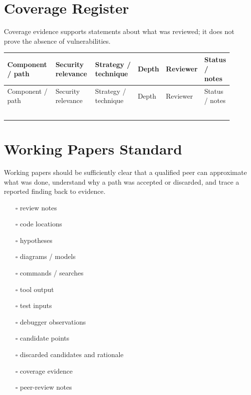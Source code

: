 \documentclass[10pt]{article}
\newcommand{\checkbox}{\ensuremath{\square}}
\begin{document}
\section{Coverage Register}
Coverage evidence supports statements about what was reviewed; it does not prove the absence of vulnerabilities.
\begin{longtable}{@{}L{0.22\linewidth}L{0.18\linewidth}L{0.20\linewidth}L{0.11\linewidth}L{0.10\linewidth}L{0.11\linewidth}@{}}
\toprule
Component / path & Security relevance & Strategy / technique & Depth & Reviewer & Status / notes \\
\midrule
\endfirsthead
\toprule
Component / path & Security relevance & Strategy / technique & Depth & Reviewer & Status / notes \\
\midrule
\endhead
\rule{0pt}{2.5em} & & & & & \\
\rule{0pt}{2.5em} & & & & & \\
\rule{0pt}{2.5em} & & & & & \\
\rule{0pt}{2.5em} & & & & & \\
\rule{0pt}{2.5em} & & & & & \\
\bottomrule
\end{longtable}

\section{Working Papers Standard}
Working papers should be sufficiently clear that a qualified peer can approximate what was done, understand why a path was accepted or discarded, and trace a reported finding back to evidence.
\begin{multicols}{2}
\begin{itemize}
\item[\checkbox] review notes
\item[\checkbox] code locations
\item[\checkbox] hypotheses
\item[\checkbox] diagrams / models
\item[\checkbox] commands / searches
\item[\checkbox] tool output
\item[\checkbox] test inputs
\item[\checkbox] debugger observations
\item[\checkbox] candidate points
\item[\checkbox] discarded candidates and rationale
\item[\checkbox] coverage evidence
\item[\checkbox] peer-review notes
\end{itemize}
\end{multicols}
\clearpage
\end{document}
